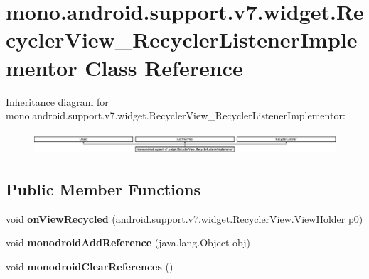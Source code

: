 \hypertarget{classmono_1_1android_1_1support_1_1v7_1_1widget_1_1_recycler_view___recycler_listener_implementor}{}\section{mono.\+android.\+support.\+v7.\+widget.\+Recycler\+View\+\_\+\+Recycler\+Listener\+Implementor Class Reference}
\label{classmono_1_1android_1_1support_1_1v7_1_1widget_1_1_recycler_view___recycler_listener_implementor}
Inheritance diagram for mono.\+android.\+support.\+v7.\+widget.\+Recycler\+View\+\_\+\+Recycler\+Listener\+Implementor\+:\begin{figure}[H]
\begin{center}
\leavevmode
\includegraphics[height=0.822320cm]{classmono_1_1android_1_1support_1_1v7_1_1widget_1_1_recycler_view___recycler_listener_implementor}
\end{center}
\end{figure}
\subsection*{Public Member Functions}
\begin{DoxyCompactItemize}
\item 
\mbox{\label{classmono_1_1android_1_1support_1_1v7_1_1widget_1_1_recycler_view___recycler_listener_implementor_a5454da38aec32481ec8ce7f5150d064d}} 
void {\bfseries on\+View\+Recycled} (android.\+support.\+v7.\+widget.\+Recycler\+View.\+View\+Holder p0)
\item 
\mbox{\label{classmono_1_1android_1_1support_1_1v7_1_1widget_1_1_recycler_view___recycler_listener_implementor_a47b5f1d0a3a4ddc09d2f8a1727069ad8}} 
void {\bfseries monodroid\+Add\+Reference} (java.\+lang.\+Object obj)
\item 
\mbox{\label{classmono_1_1android_1_1support_1_1v7_1_1widget_1_1_recycler_view___recycler_listener_implementor_a70d9d815893736085322f6ed97dfad5e}} 
void {\bfseries monodroid\+Clear\+References} ()
\end{DoxyCompactItemize}
